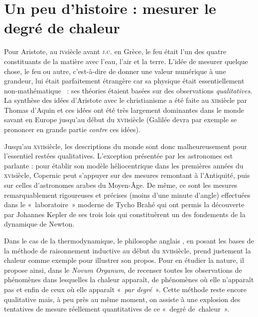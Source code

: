 \atstartofhistorysection
\section[Un peu d’histoire : mesurer le degré de chaleur]{Un peu d’histoire :\onlyamphibook{\\} mesurer le degré de chaleur}
\label{ch_histoire_degre_chaleur_depondt}


	Pour Aristote, au \textsc{iv}\ieme siècle avant \textsc{j.c.} en Grèce, le feu était l'un des quatre constituants de la matière avec l'eau, l'air et la terre. L'idée de mesurer quelque chose, le feu ou autre, c'est-à-dire de donner une valeur numérique à une grandeur, lui était parfaitement étrangère car sa physique était essentiellement non-mathématique~\cite{koyre1966} : ses théories étaient basées sur des observations \emph{qualitatives}. La synthèse des idées d'Aristote avec le christianisme a été faite au \textsc{xii}\ieme siècle par Thomas d'Aquin et ces idées ont été très largement dominantes dans le monde savant en Europe jusqu'au début du \textsc{xvii}\ieme siècle (Galilée devra par exemple se prononcer en grande partie \emph{contre} ces idées).
	
	Jusqu’au \textsc{xvii}\ieme siècle, les descriptions du monde sont donc malheureusement pour l'essentiel restées qualitatives. L’exception présentée par les astronomes est parlante : pour établir son modèle héliocentrique dans les premières années du \textsc{xvi}\ieme siècle, Copernic peut s'appuyer sur des mesures remontant à l'Antiquité, puis sur celles d’astronomes arabes du Moyen-Âge. De même, ce sont les mesures remarquablement rigoureuses et précises (moins d'une minute d'angle) effectuées dans le «~laboratoire~» moderne de Tycho Brahé qui ont permis la découverte par Johannes Kepler de ses trois lois qui constituèrent un des fondements de la dynamique de Newton.
		
	Dans le cas de la thermodynamique, le philosophe anglais , en posant les bases de la méthode de raisonnement inductive au début du \textsc{xvii}\ieme siècle, prend justement la chaleur comme exemple pour illustrer son propos. Pour en étudier la nature, il propose ainsi, dans le \textit{Novum Organum}, de recenser toutes les observations de phénomènes dans lesquelles la chaleur apparaît, de phénomènes où elle n'apparaît pas et enfin de ceux où elle apparaît «~\emph{par degré}~». Cette méthode reste encore qualitative mais, à peu près au même moment, on assiste à une explosion des tentatives de mesure réellement quantitatives de ce «~degré de~chaleur~».
	
